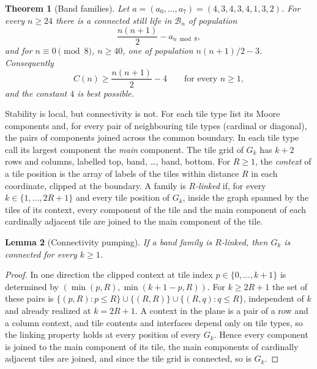 \documentclass[10pt]{article}
\newtheorem{theorem}{Theorem}[section]
\newtheorem{lemma}[theorem]{Lemma}
\theoremstyle{remark}
\newcommand{\B}{\mathcal B}
\begin{document}
\begin{theorem}[Band families]\label{thm:bands}
Let $a=(a_0,\ldots,a_7)=(4,3,4,3,4,1,3,2)$.  For every $n\ge24$ there is a
connected still life in $\B_n$ of population
\begin{equation}\label{eq:band-family}
 \frac{n(n+1)}2-a_{n\bmod8},
\end{equation}
and for $n\equiv0\pmod8$, $n\ge40$, one of population $n(n+1)/2-3$.  Consequently
\begin{equation}\label{eq:uniform-lower}
 C(n)\ge\frac{n(n+1)}2-4\qquad\text{for every }n\ge1,
\end{equation}
and the constant $4$ is best possible.
\end{theorem}

Stability is local, but connectivity is not.  For each tile type list its
Moore components and, for every pair of neighbouring tile types (cardinal or
diagonal), the pairs of components joined across the common boundary.  In each
tile type call its largest component the \emph{main} component.  The tile grid
of $G_k$ has $k+2$ rows and columns, labelled top, band, \ldots, band, bottom.
For $R\ge1$, the \emph{context} of a tile position is the array of labels of the
tiles within distance $R$ in each coordinate, clipped at the boundary.  A family
is \emph{$R$-linked} if, for every $k\in\{1,\ldots,2R+1\}$ and every tile
position of $G_k$, inside the graph spanned by the tiles of its context, every
component of the tile and the main component of each cardinally adjacent tile
are joined to the main component of the tile.

\begin{lemma}[Connectivity pumping]\label{lem:pumping}
If a band family is $R$-linked, then $G_k$ is connected for every $k\ge1$.
\end{lemma}

\begin{proof}
In one direction the clipped context at tile index $p\in\{0,\ldots,k+1\}$ is
determined by $(\min(p,R),\min(k+1-p,R))$.  For $k\ge2R+1$ the set of these
pairs is $\{(p,R):p\le R\}\cup\{(R,R)\}\cup\{(R,q):q\le R\}$, independent of $k$
and already realized at $k=2R+1$.  A context in the plane is a pair of a row and
a column context, and tile contents and interfaces depend only on tile types, so
the linking property holds at every position of every $G_k$.  Hence every
component is joined to the main component of its tile, the main components of
cardinally adjacent tiles are joined, and since the tile grid is connected, so
is $G_k$.
\end{proof}
\end{document}
